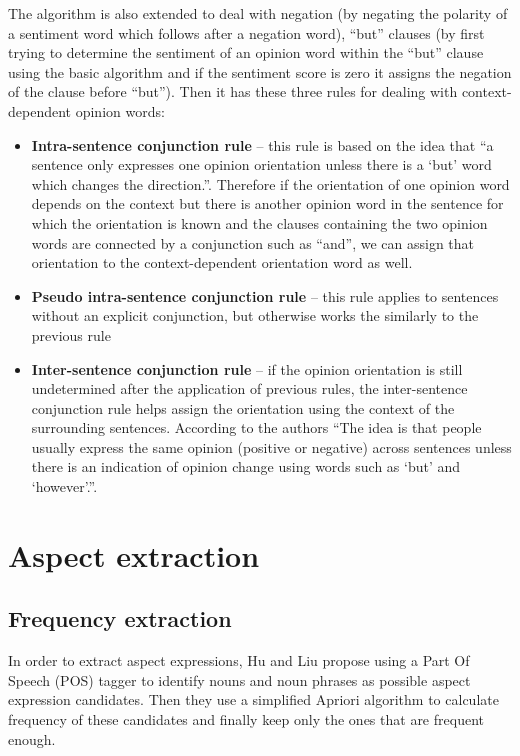 The algorithm is also extended to deal with negation (by negating the polarity of a sentiment word which follows after a negation word), ``but'' clauses (by first trying to determine the sentiment of an opinion word within the ``but'' clause using the basic algorithm and if the sentiment score is zero it assigns the negation of the clause before ``but''). Then it has these three rules for dealing with context-dependent opinion words:
\begin{itemize}
\item \textbf{Intra-sentence conjunction rule} -- this rule is based on the idea that ``a sentence only expresses one opinion
orientation unless there is a `but' word which changes the
direction.''\cite{ding_hu_liu}. Therefore if the orientation of one opinion word depends on the context but there is another opinion word in the sentence for which the orientation is known and the clauses containing the two opinion words are connected by a conjunction such as ``and'', we can assign that orientation to the context-dependent orientation word as well.
\item \textbf{Pseudo intra-sentence conjunction rule} -- this rule applies to sentences without an explicit conjunction, but otherwise works the similarly to the previous rule
\item \textbf{Inter-sentence conjunction rule} -- if the opinion orientation is still undetermined after the application of previous rules, the inter-sentence conjunction rule helps assign the orientation using the context of the surrounding sentences. According to the authors ``The idea is that people usually express the same
opinion (positive or negative) across sentences unless there is
an indication of opinion change using words such as `but' and
`however'.''\cite{ding_hu_liu}.
\end{itemize}
\section{Aspect extraction}
\subsection{Frequency extraction}
In order to extract aspect expressions, Hu and Liu \cite{hu_liu_2015} propose using a Part Of Speech (POS) tagger to identify nouns and noun phrases as possible aspect expression candidates. Then they use a simplified Apriori algorithm to calculate frequency of these candidates and finally keep only the ones that are frequent enough. 
  
